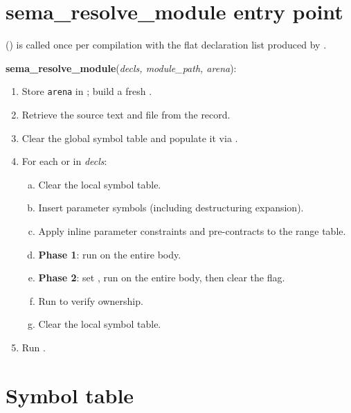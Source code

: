 \section{sema\_resolve\_module entry point}
\label{sec:sema-entry}

\pnum
{}
() is called once per compilation with the flat
declaration list produced by .

\begin{algorithm}
\textbf{sema\_resolve\_module}(\textit{decls, module\_path, arena}):
\begin{enumerate}
\item Store \texttt{arena} in ; build a fresh .
\item Retrieve the source text and file from the  record.
\item Clear the global symbol table and populate it via .
\item For each  or  in \textit{decls}:
  \begin{enumerate}[(a)]
  \item Clear the local symbol table.
  \item Insert parameter symbols (including destructuring expansion).
  \item Apply inline parameter constraints and pre-contracts to the range table.
  \item \textbf{Phase 1}: run  on the entire body.
  \item \textbf{Phase 2}: set ,
    run  on the entire body, then clear the flag.
  \item Run  to verify ownership.
  \item Clear the local symbol table.
  \end{enumerate}
\item Run .
\end{enumerate}
\end{algorithm}

\section{Symbol table}
\label{sec:sema-symtab}

